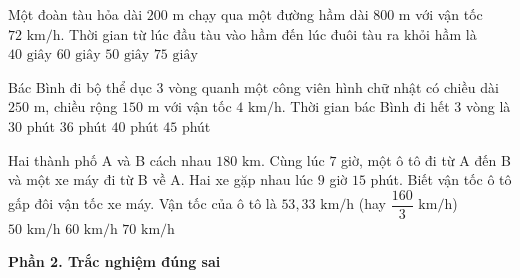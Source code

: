\begin{ex} %
Một đoàn tàu hỏa dài $200\text{ m}$ chạy qua một đường hầm dài $800\text{ m}$ với vận tốc $72\text{ km/h}$. Thời gian từ lúc đầu tàu vào hầm đến lúc đuôi tàu ra khỏi hầm là
\choice
{$40\text{ giây}$}
{$60\text{ giây}$}
{\True $50\text{ giây}$}
{$75\text{ giây}$}
\end{ex}

\begin{ex} %
Bác Bình đi bộ thể dục $3$ vòng quanh một công viên hình chữ nhật có chiều dài $250\text{ m}$, chiều rộng $150\text{ m}$ với vận tốc $4\text{ km/h}$. Thời gian bác Bình đi hết 3 vòng là
\choice
{$30$ phút}
{\True $36$ phút}
{$40$ phút}
{$45$ phút}
\end{ex}

\begin{ex} %
Hai thành phố A và B cách nhau $180\text{ km}$. Cùng lúc $7$ giờ, một ô tô đi từ A đến B và một xe máy đi từ B về A. Hai xe gặp nhau lúc $9$ giờ $15$ phút. Biết vận tốc ô tô gấp đôi vận tốc xe máy. Vận tốc của ô tô là
\choice
{\True $53{,}33\text{ km/h}$ (hay $\dfrac{160}{3}\text{ km/h}$)}
{$50\text{ km/h}$}
{$60\text{ km/h}$}
{$70\text{ km/h}$}
\end{ex}

\textbf{Phần 2. Trắc nghiệm đúng sai}

